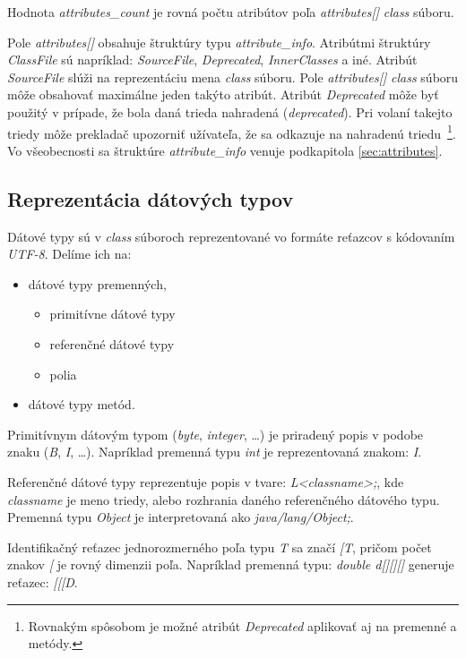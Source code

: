 \documentclass[11pt,final,oneside]{fithesis}
\begin{document}
Hodnota \textit{attributes\_count} je rovná počtu atribútov poľa
\textit{attributes[]} \textit{class} súboru.

Pole \textit{attributes[]} obsahuje štruktúry typu \textit{attribute\_info}.
Atribútmi štruktúry \textit{ClassFile} sú napríklad: \textit{SourceFile},
\textit{Deprecated}, \textit{InnerClasses} a iné. Atribút \textit{SourceFile} 
slúži na reprezentáciu mena \textit{class} súboru. Pole \textit{attributes[]}
\textit{class} súboru môže obsahovať maximálne jeden takýto atribút. Atribút
\textit{Deprecated} môže byť použitý v prípade, že bola daná trieda nahradená
(\textit{deprecated}). Pri volaní takejto triedy môže prekladač upozorniť 
užívateľa, že sa odkazuje na nahradenú triedu~\footnote{Rovnakým spôsobom je
možné atribút \textit{Deprecated} aplikovať aj na premenné a metódy.}. Vo
všeobecnosti sa štruktúre \textit{attribute\_info} venuje
podkapitola \ref{sec:attributes}.

\subsection{Reprezentácia dátových typov}
\label{sec:descriptors}
Dátové typy sú v \textit{class} súboroch reprezentované vo formáte reťazcov
s kódovaním \textit{UTF-8}. Delíme ich na:
\begin{itemize}
\item dátové typy premenných,
\begin{itemize}
\item primitívne dátové typy
\item referenčné dátové typy
\item polia
\end{itemize}
\item dátové typy metód.
\end{itemize}

Primitívnym dátovým typom (\textit{byte}, \textit{integer}, …) je priradený
popis v podobe znaku (\textit{B}, \textit{I}, …). Napríklad premenná typu
\textit{int} je reprezentovaná znakom: \textit{I}.

Referenčné dátové typy reprezentuje popis v tvare: \textit{L<classname>;}, kde 
\textit{classname} je meno triedy, alebo rozhrania daného referenčného
dátového typu. Premenná typu \textit{Object} je interpretovaná ako
\textit{java/lang/Object;}. 

Identifikačný reťazec jednorozmerného poľa typu \textit{T} sa značí
\textit{[T}, pričom počet znakov \textit{[} je rovný dimenzii poľa. Napríklad
premenná typu: \textit{double d[][][]} generuje reťazec: \textit{[[[D}.
\end{document}
